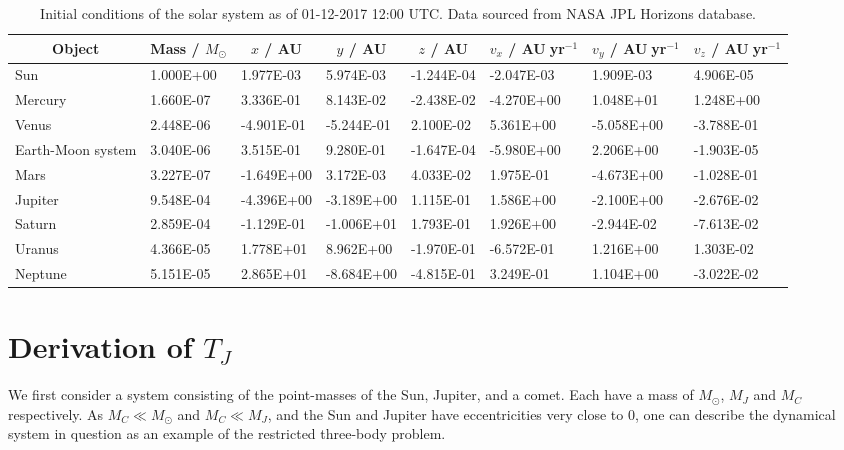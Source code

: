 \begin{table}
\caption[Initial conditions]{Initial conditions of the solar system as of 01-12-2017 12:00 UTC. Data sourced from NASA JPL Horizons database.}\vspace{3ex}
\label{table:init_con}
\begin{tabular}{llllllll} \toprule \toprule
\multicolumn{1}{c}{Object} & \multicolumn{1}{c}{Mass / $M_{\odot}$} & \multicolumn{1}{c}{$x$ / AU} & \multicolumn{1}{c}{$y$ / AU} & \multicolumn{1}{c}{$z$ / AU} & \multicolumn{1}{c}{$v_x$ / AU$\;$yr$^{-1}$}& \multicolumn{1}{c}{$v_y$  / AU$\;$yr$^{-1}$}& \multicolumn{1}{c}{$v_z$  / AU$\;$yr$^{-1}$}\\ \midrule
Sun & 1.000E+00 & 1.977E-03 & 5.974E-03 & -1.244E-04 & -2.047E-03 & 1.909E-03 & 4.906E-05 \\
Mercury & 1.660E-07 & 3.336E-01 & 8.143E-02 & -2.438E-02 & -4.270E+00 & 1.048E+01 & 1.248E+00 \\
Venus & 2.448E-06 & -4.901E-01 & -5.244E-01 & 2.100E-02 & 5.361E+00 & -5.058E+00 & -3.788E-01 \\
Earth-Moon system & 3.040E-06 & 3.515E-01 & 9.280E-01 & -1.647E-04 & -5.980E+00 & 2.206E+00 & -1.903E-05 \\
Mars & 3.227E-07 & -1.649E+00 & 3.172E-03 & 4.033E-02 & 1.975E-01 & -4.673E+00 & -1.028E-01 \\
Jupiter & 9.548E-04 & -4.396E+00 & -3.189E+00 & 1.115E-01 & 1.586E+00 & -2.100E+00 & -2.676E-02 \\
Saturn & 2.859E-04 & -1.129E-01 & -1.006E+01 & 1.793E-01 & 1.926E+00 & -2.944E-02 & -7.613E-02 \\
Uranus & 4.366E-05 & 1.778E+01 & 8.962E+00 & -1.970E-01 & -6.572E-01 & 1.216E+00 & 1.303E-02 \\
Neptune & 5.151E-05 & 2.865E+01 & -8.684E+00 & -4.815E-01 & 3.249E-01 & 1.104E+00 & -3.022E-02 \\
\bottomrule
\end{tabular}
\end{table}

\clearpage
\section*{Derivation of $T_J$}

We first consider a system consisting of the point-masses of the Sun, Jupiter, and a comet. Each have a mass of $M_\odot$, $M_J$ and $M_C$ respectively. As $M_C \ll M_\odot$ and $M_C \ll M_J$, and the Sun and Jupiter have eccentricities very close to 0, one can describe the dynamical system in question as an example of the restricted three-body problem.


